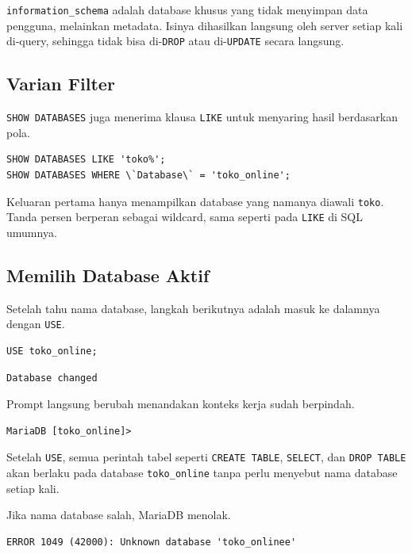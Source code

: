 \documentclass[11pt,a4paper]{article}
\begin{document}
\texttt{information\_schema} adalah database khusus yang tidak menyimpan data pengguna, melainkan metadata. Isinya dihasilkan langsung oleh server setiap kali di-query, sehingga tidak bisa di-\texttt{DROP} atau di-\texttt{UPDATE} secara langsung.

\subsection{Varian Filter}

\texttt{SHOW DATABASES} juga menerima klausa \texttt{LIKE} untuk menyaring hasil berdasarkan pola.

\begin{lstlisting}[style=code]
SHOW DATABASES LIKE 'toko%';
SHOW DATABASES WHERE \`Database\` = 'toko_online';
\end{lstlisting}

Keluaran pertama hanya menampilkan database yang namanya diawali \texttt{toko}. Tanda persen berperan sebagai wildcard, sama seperti pada \texttt{LIKE} di SQL umumnya.

\subsection{Memilih Database Aktif}

Setelah tahu nama database, langkah berikutnya adalah masuk ke dalamnya dengan \texttt{USE}.

\begin{lstlisting}[style=code]
USE toko_online;
\end{lstlisting}

\begin{lstlisting}[style=out]
Database changed
\end{lstlisting}

Prompt langsung berubah menandakan konteks kerja sudah berpindah.

\begin{lstlisting}[style=out]
MariaDB [toko_online]>
\end{lstlisting}

Setelah \texttt{USE}, semua perintah tabel seperti \texttt{CREATE TABLE}, \texttt{SELECT}, dan \texttt{DROP TABLE} akan berlaku pada database \texttt{toko\_online} tanpa perlu menyebut nama database setiap kali.

Jika nama database salah, MariaDB menolak.

\begin{lstlisting}[style=out]
ERROR 1049 (42000): Unknown database 'toko_onlinee'
\end{lstlisting}
\end{document}
